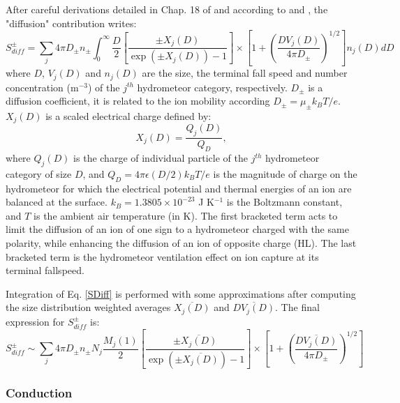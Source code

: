 After careful derivations detailed in Chap. 18 of \citet{Pruppacher-1996} and according to \citet{Helsdon-1980} and \citet{Helsdon-2002}, the "diffusion" contribution writes:
\begin{equation}\label{SDiff}
  S^{\pm} _{diff} = \sum_{j} 4 \pi D_{\pm} n_{\pm} \int_{0}^{\infty} \frac{D}{2} 
                    \left[ \frac{\pm X_j(D)}{\exp (\pm X_j(D))-1} \right] \times
                    \left[ 1 + \left( \frac{DV_j(D)}{4 \pi D_{\pm}}\right)^{1/2} \right] n_j(D) dD 
\end{equation}
where $D$, $V_j(D)$ and $n_j(D)$ are the size, the terminal fall speed and number concentration (m$^{-3}$) of the $j^{th}$ hydrometeor category, respectively.
$D_{\pm}$ is a diffusion coefficient, it is related to the ion mobility according $D_{\pm} = \mu_{\pm}k_B T/e$. 
$X_j(D)$ is a scaled electrical charge defined by:
\begin{equation}
  X_j(D) = \frac{Q_j(D)}{Q_D},
\end{equation}
where $Q_j(D)$ is the charge of individual particle of the $j^{th}$ hydrometeor category of size $D$, and $Q_D = 4 \pi \epsilon (D/2) k_B T / e$ is the magnitude of charge on the hydrometeor for which the electrical potential and thermal energies of an ion are balanced at the surface.
$k_B = 1.3805 \times 10^{-23}$ J K$^{-1}$ is the Boltzmann constant, and $T$ is the ambient air temperature (in K).
The first bracketed term acts to limit the diffusion of an ion of one sign to a hydrometeor charged with the same polarity, while enhancing the diffusion of an ion of opposite charge (HL). 
The last bracketed term is the hydrometeor ventilation effect on ion capture at its terminal fallspeed.

Integration of Eq. \ref{SDiff} is performed with some approximations after computing the size distribution weighted averages $\overline{X_j(D)}$ and $\overline{DV_j(D)}$. The final expression for $S^{\pm} _{diff}$ is:
\begin{equation}
  S^{\pm} _{diff} \sim  \sum_{j} 4 \pi D_{\pm} n_{\pm} N_j \frac{M_j(1)}{2} 
                    \left[ \frac{\pm \overline{X_j(D)}}{\exp (\pm \overline{X_j(D)})-1} \right] \times
                    \left[ 1 + \left( \frac{\overline{DV_j(D)}}{4 \pi D_{\pm}}\right)^{1/2} \right]
\end{equation}


\subsubsection{Conduction}

